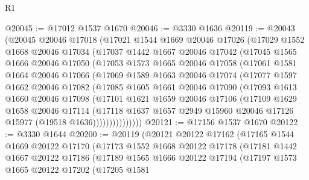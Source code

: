 \begin{lexlean}{R1}
\begin{coremodule}
@20045 := @17012 @1537 @1670
@20046 := @3330 @1636
@20119 := @20043
    (@20045
      @20046
      @17018
      (@17021
        @1544
        @1669
        @20046
        @17026
        (@17029
          @1552
          @1668
          @20046
          @17034
          (@17037
            @1442
            @1667
            @20046
            @17042
            (@17045
              @1565
              @1666
              @20046
              @17050
              (@17053
                @1573
                @1665
                @20046
                @17058
                (@17061
                  @1581
                  @1664
                  @20046
                  @17066
                  (@17069
                    @1589
                    @1663
                    @20046
                    @17074
                    (@17077
                      @1597
                      @1662
                      @20046
                      @17082
                      (@17085
                        @1605
                        @1661
                        @20046
                        @17090
                        (@17093
                          @1613
                          @1660
                          @20046
                          @17098
                          (@17101
                            @1621
                            @1659
                            @20046
                            @17106
                            (@17109
                              @1629
                              @1658
                              @20046
                              @17114
                              (@17118
                                @1637
                                @1657
                                @2949
                                @15960
                                @20046
                                @17126
                                @15977
                                (@19518 @1636)))))))))))))))
@20121 := @17156 @1537 @1670
@20122 := @3330 @1644
@20200 := @20119
    (@20121
      @20122
      @17162
      (@17165
        @1544
        @1669
        @20122
        @17170
        (@17173
          @1552
          @1668
          @20122
          @17178
          (@17181
            @1442
            @1667
            @20122
            @17186
            (@17189
              @1565
              @1666
              @20122
              @17194
              (@17197
                @1573
                @1665
                @20122
                @17202
                (@17205
                  @1581

\end{coremodule}
\end{lexlean}
